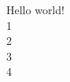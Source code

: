 \documentclass{article}
\begin{document}
    Hello world!
    \\1
    \\2
    \\3
    \\4
\end{document}
